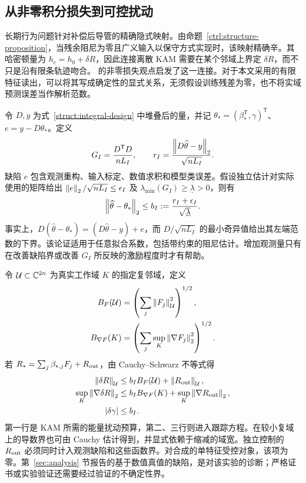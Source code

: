 \subsection{从非零积分损失到可控扰动}
\label{kam:learning-section}

长期行为问题针对补偿后导管的精确隐式映射。由命题~\ref{ctrl:structure-proposition}，当残余阻尼为零且广义输入以保守方式实现时，该映射精确辛。其哈密顿量为 $h_c=h_0+\delta R$，因此连接离散 KAM 需要在某个邻域上界定 $\delta R$，而不只是沿有限条轨迹吻合。\citet{chen2022} 的非零损失观点启发了这一连接。对于本文采用的有限特征读出，可以将其写成确定性的显式关系，无须假设训练残差为零，也不将实域预测误差当作解析范数。

令 $D,y$ 为式~\eqref{struct:integral-design} 中堆叠后的量，并记 $\theta_*=(\beta_*^{\mathsf T},\gamma)^{\mathsf T}$、$e=y-D\theta_*$。定义
\begin{equation}\label{kam:gram}
 G_I=\frac{D^{\mathsf T}D}{nL_I},\qquad
 r_I=\frac{\left\lVert D\widehat\theta-y\right\rVert_2}{\sqrt{nL_I}}.
\end{equation}
缺陷 $e$ 包含观测重构、输入标定、数值求积和模型类误差。假设独立估计对实际使用的矩阵给出
$\left\lVert e\right\rVert_2/\sqrt{nL_I}\le\epsilon_I$ 及
$\lambda_{\min}(G_I)\ge\underline\lambda>0$，则有
\begin{equation}\label{kam:integral-bound}
 \left\lVert\widehat\theta-\theta_*\right\rVert_2
 \le b_I:=\frac{r_I+\epsilon_I}{\sqrt{\underline\lambda}}.
\end{equation}
事实上，$D(\widehat\theta-\theta_*)=(D\widehat\theta-y)+e$，而 $D/\sqrt{nL_I}$ 的最小奇异值给出其左端范数的下界。该论证适用于任意拟合系数，包括带约束的阻尼估计。增加观测量只有在改善缺陷界或改善 $G_I$ 所反映的激励程度时才有帮助。

令 $\mathcal U\subset\mathbb C^{2n}$ 为真实工作域 $K$ 的指定复邻域，定义
\begin{equation}\label{kam:feature-bounds}
\begin{aligned}
 B_F(\mathcal U)&=\left(\sum_j\left\lVert F_j\right\rVert_{\mathcal U}^{2}\right)^{1/2},\\
 B_{\nabla F}(K)&=\left(\sum_j\sup_K\left\lVert\nabla F_j\right\rVert_2^2\right)^{1/2}.
\end{aligned}
\end{equation}
若 $R_*=\sum_j\beta_{*,j}F_j+R_{\rm out}$，由 Cauchy--Schwarz 不等式得
\begin{equation}\label{kam:analytic-error}
\begin{aligned}
 \left\lVert\delta R\right\rVert_{\mathcal U}
    &\le b_I B_F(\mathcal U)+\left\lVert R_{\rm out}\right\rVert_{\mathcal U},\\
 \sup_K\left\lVert\nabla\delta R\right\rVert_2
    &\le b_I B_{\nabla F}(K)+\sup_K\left\lVert\nabla R_{\rm out}\right\rVert_2,\\
 |\delta\gamma|&\le b_I.
\end{aligned}
\end{equation}
第一行是 KAM 所需的能量扰动预算，第二、三行则进入跟踪方程。在较小复域上的导数界也可由 Cauchy 估计得到，并显式依赖于缩减的域宽。独立控制的 $R_{\rm out}$ 必须同时计入观测缺陷和这些函数界。对合成的单特征受控对象，该项为零。第~\ref{sec:analysis} 节报告的基于数值真值的缺陷，是对该实验的诊断；严格证书或实验验证还需要经过验证的不确定性界。

